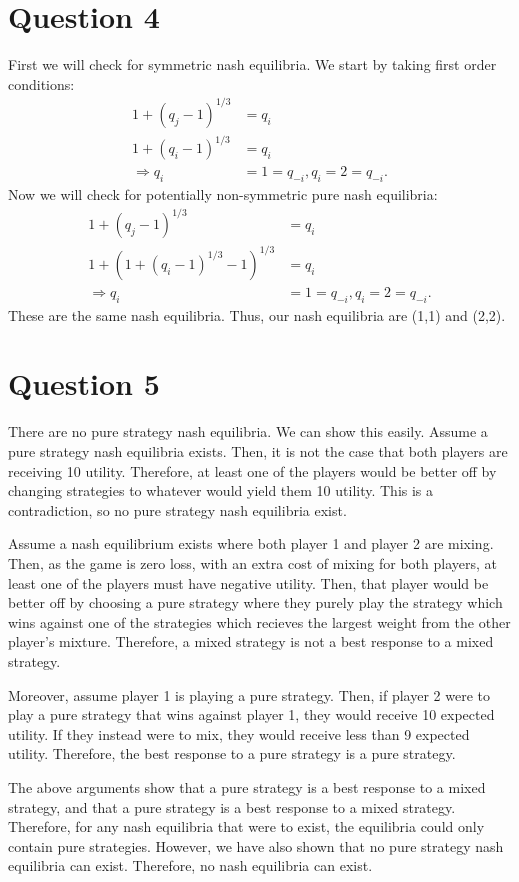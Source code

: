 \documentclass[11pt]{article} %
\begin{document}
\section{Question 4}
First we will check for symmetric nash equilibria. We start by taking first order conditions:
\begin{align*}
1+(q_j - 1)^{1/3} &= q_i\\
1+(q_i - 1)^{1/3} &= q_i\\
\Rightarrow q_i &= 1 = q_{-i}, q_i = 2 = q_{-i}.
\end{align*}
Now we will check for potentially non-symmetric pure nash equilibria:
\begin{align*}
1+(q_j - 1)^{1/3} &= q_i\\
1+(1+(q_i - 1)^{1/3} - 1)^{1/3} &= q_i\\
\Rightarrow q_i &= 1 = q_{-i}, q_i = 2 = q_{-i}.
\end{align*}
These are the same nash equilibria. Thus, our nash equilibria are (1,1) and (2,2). %
\section{Question 5}

There are no pure strategy nash equilibria. We can show this easily. Assume a pure strategy nash equilibria exists. Then, it is not the case that both players are receiving 10 utility. Therefore, at least one of the players would be better off by changing strategies to whatever would yield them 10 utility. This is a contradiction, so no pure strategy nash equilibria exist.

Assume a nash equilibrium exists where both player 1 and player 2 are mixing. Then, as the game is zero loss, with an extra cost of mixing for both players, at least one of the players must have negative utility. Then, that player would be better off by choosing a pure strategy where they purely play the strategy which wins against one of the strategies which recieves the largest weight from the other player's mixture. Therefore, a mixed strategy is not a best response to a mixed strategy.

Moreover, assume player 1 is playing a pure strategy. Then, if player 2 were to play a pure strategy that wins against player 1, they would receive 10 expected utility. If they instead were to mix, they would receive less than 9 expected utility. Therefore, the best response to a pure strategy is a pure strategy.

The above arguments show that a pure strategy is a best response to a mixed strategy, and that a pure strategy is a best response to a mixed strategy. Therefore, for any nash equilibria that were to exist, the equilibria could only contain pure strategies. However, we have also shown that no pure strategy nash equilibria can exist. Therefore, no nash equilibria can exist.
\end{document}
